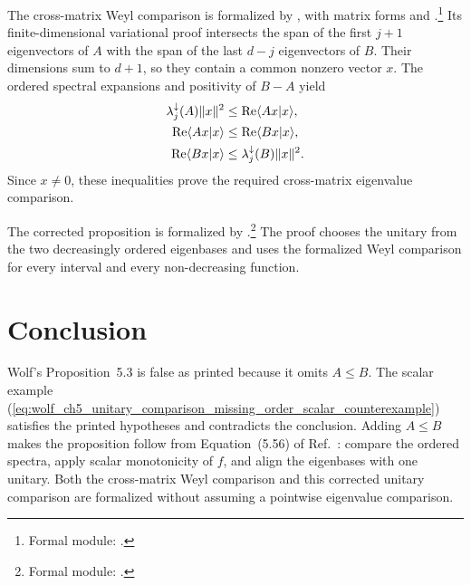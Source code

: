 \documentclass{article}
\begin{document}
The cross-matrix Weyl comparison is formalized by
, with
matrix forms  and
.\footnote{Formal module:
    .}
Its finite-dimensional variational proof intersects the span of the first
$j+1$ eigenvectors of $A$ with the span of the last $d-j$ eigenvectors of
$B$. Their dimensions sum to $d+1$, so they contain a common nonzero vector
$x$. The ordered spectral expansions and positivity of $B-A$ yield
\begin{align}
    \lambda_j^\downarrow(A)\lVert x\rVert^2
        &\leq \operatorname{Re}\langle Ax | x \rangle,
    \label{eq:wolf_ch5_unitary_comparison_missing_order_variational_lower_bound}\\
    \operatorname{Re}\langle Ax | x \rangle
        &\leq \operatorname{Re}\langle Bx | x \rangle,
    \label{eq:wolf_ch5_unitary_comparison_missing_order_positive_difference_bound}\\
    \operatorname{Re}\langle Bx | x \rangle
        &\leq \lambda_j^\downarrow(B)\lVert x\rVert^2.
    \label{eq:wolf_ch5_unitary_comparison_missing_order_variational_upper_bound}
\end{align}
Since $x\neq0$, these inequalities prove the required cross-matrix
eigenvalue comparison.

The corrected proposition is formalized by
.\footnote{Formal
    module: .}
The proof chooses the unitary from the two decreasingly ordered eigenbases and
uses the formalized Weyl comparison for every interval and every
non-decreasing function.

\section{Conclusion}

Wolf's Proposition~5.3 is false as printed because it omits $A\leq B$. The
scalar example
(\ref{eq:wolf_ch5_unitary_comparison_missing_order_scalar_counterexample})
satisfies the printed hypotheses and contradicts the conclusion. Adding
$A\leq B$ makes the proposition follow from Equation~(5.56) of
Ref.~\cite{Wolf2012Quantum}: compare the ordered spectra, apply scalar
monotonicity of $f$, and align the eigenbases with one unitary. Both the
cross-matrix Weyl comparison and this corrected unitary comparison are
formalized without assuming a pointwise eigenvalue comparison.



\end{document}
